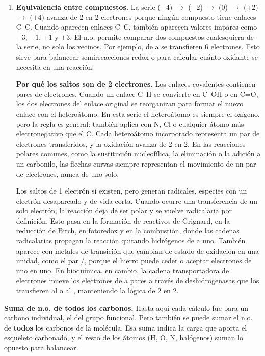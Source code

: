 \begin{enumerate}
    \item \textbf{Equivalencia entre compuestos.} La serie  
    ($-4$) $\to$  ($-2$) $\to$  ($0$) $\to$  
    ($+2$) $\to$  ($+4$) avanza de 2 en 2 electrones porque ningún 
    compuesto tiene enlaces C--C. Cuando aparecen enlaces C--C, también 
    aparecen valores impares como $-3$, $-1$, $+1$ y $+3$. El n.o. permite 
    comparar dos compuestos cualesquiera de la serie, no solo los vecinos. 
    Por ejemplo, de  a  se transfieren 6 electrones. Esto 
    sirve para balancear semirreacciones redox o para calcular cuánto 
    oxidante se necesita en una reacción.

    \textbf{Por qué los saltos son de 2 electrones.} Los enlaces covalentes 
    contienen pares de electrones. Cuando un enlace C--H se convierte en 
    C--OH o en C=O, los dos electrones del enlace original se reorganizan 
    para formar el nuevo enlace con el heteroátomo. En esta serie el 
    heteroátomo es siempre el oxígeno, pero la regla es general: también 
    aplica con N, Cl o cualquier átomo más electronegativo que el C. Cada 
    heteroátomo incorporado representa un par de electrones transferidos, 
    y la oxidación avanza de 2 en 2. En las reacciones polares comunes, 
    como la sustitución nucleofílica, la eliminación o la adición a un 
    carbonilo, las flechas curvas siempre representan el movimiento de un 
    par de electrones, nunca de uno solo.

    Los saltos de 1 electrón sí existen, pero generan radicales, especies 
    con un electrón desapareado y de vida corta. Cuando ocurre una 
    transferencia de un solo electrón, la reacción deja de ser polar y se 
    vuelve radicalaria por definición. Esto pasa en la formación de 
    reactivos de Grignard, en la reducción de Birch, en fotoredox y en la 
    combustión, donde las cadenas radicalarias propagan la reacción 
    quitando hidrógenos de a uno. También aparece con metales de transición 
    que cambian de estado de oxidación en una unidad, como el par 
    /, porque el hierro 
    puede ceder o aceptar electrones de uno en uno. En bioquímica, en 
    cambio, la cadena transportadora de electrones mueve los electrones de 
    a pares a través de deshidrogenasas que los transfieren al  
    o al , manteniendo la lógica de 2 en 2.
\end{enumerate}

\textbf{Suma de n.o. de todos los carbonos.} Hasta aquí cada cálculo fue 
para un carbono individual, el del grupo funcional. Pero también se puede 
sumar el n.o. de \textbf{todos} los carbonos de la molécula. Esa suma 
indica la carga que aporta el esqueleto carbonado, y el resto de los 
átomos (H, O, N, halógenos) suman lo opuesto para balancear.

